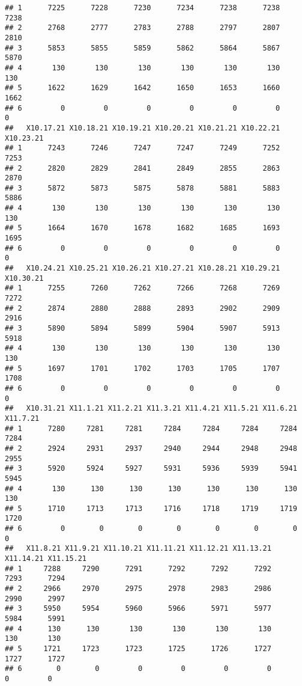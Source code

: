 \documentclass[
]{article}
\begin{document}
\begin{verbatim}
## 1      7225      7228      7230      7234      7238      7238      7238
## 2      2768      2777      2783      2788      2797      2807      2810
## 3      5853      5855      5859      5862      5864      5867      5870
## 4       130       130       130       130       130       130       130
## 5      1622      1629      1642      1650      1653      1660      1662
## 6         0         0         0         0         0         0         0
##   X10.17.21 X10.18.21 X10.19.21 X10.20.21 X10.21.21 X10.22.21 X10.23.21
## 1      7243      7246      7247      7247      7249      7252      7253
## 2      2820      2829      2841      2849      2855      2863      2870
## 3      5872      5873      5875      5878      5881      5883      5886
## 4       130       130       130       130       130       130       130
## 5      1664      1670      1678      1682      1685      1693      1695
## 6         0         0         0         0         0         0         0
##   X10.24.21 X10.25.21 X10.26.21 X10.27.21 X10.28.21 X10.29.21 X10.30.21
## 1      7255      7260      7262      7266      7268      7269      7272
## 2      2874      2880      2888      2893      2902      2909      2916
## 3      5890      5894      5899      5904      5907      5913      5918
## 4       130       130       130       130       130       130       130
## 5      1697      1701      1702      1703      1705      1707      1708
## 6         0         0         0         0         0         0         0
##   X10.31.21 X11.1.21 X11.2.21 X11.3.21 X11.4.21 X11.5.21 X11.6.21 X11.7.21
## 1      7280     7281     7281     7284     7284     7284     7284     7284
## 2      2924     2931     2937     2940     2944     2948     2948     2955
## 3      5920     5924     5927     5931     5936     5939     5941     5945
## 4       130      130      130      130      130      130      130      130
## 5      1710     1713     1713     1716     1718     1719     1719     1720
## 6         0        0        0        0        0        0        0        0
##   X11.8.21 X11.9.21 X11.10.21 X11.11.21 X11.12.21 X11.13.21 X11.14.21 X11.15.21
## 1     7288     7290      7291      7292      7292      7292      7293      7294
## 2     2966     2970      2975      2978      2983      2986      2990      2997
## 3     5950     5954      5960      5966      5971      5977      5984      5991
## 4      130      130       130       130       130       130       130       130
## 5     1721     1723      1723      1725      1726      1727      1727      1727
## 6        0        0         0         0         0         0         0         0

\end{verbatim}
\end{document}

